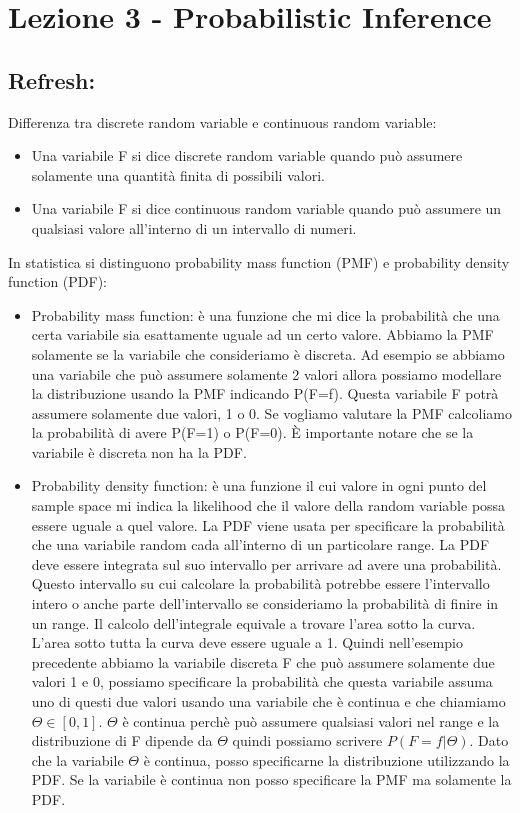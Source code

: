 \documentclass[14pt]{extreport}
\begin{document}
\chapter{Lezione 3 - Probabilistic Inference}

\section{Refresh: } Differenza tra discrete random variable e continuous random variable:
\begin{itemize}
\item Una variabile F si dice discrete random variable quando può assumere solamente una quantità finita di possibili valori.
\item Una variabile F si dice continuous random variable quando può assumere un qualsiasi valore all'interno di un intervallo di numeri.
\end{itemize}

In statistica si distinguono probability mass function (PMF) e probability density function (PDF):
\begin{itemize}
\item Probability mass function: è una funzione che mi dice la probabilità che una certa variabile sia esattamente uguale ad un certo valore. Abbiamo
la PMF solamente se la variabile che consideriamo è discreta. Ad esempio se abbiamo una variabile che può assumere solamente 2 valori allora possiamo
modellare la distribuzione usando la PMF indicando P(F=f). Questa variabile F potrà assumere solamente due valori, 1 o 0. Se vogliamo valutare la PMF
calcoliamo la probabilità di avere P(F=1) o P(F=0). È importante notare che se la variabile è discreta non ha la PDF.
\item Probability density function: è una funzione il cui valore in ogni punto del sample space mi indica la likelihood che il valore della random
variable possa essere uguale a quel valore. La PDF viene usata per specificare la probabilità che una variabile random cada all'interno di un
particolare range. La PDF deve essere integrata sul suo intervallo per arrivare ad avere una probabilità. Questo intervallo su cui calcolare la
probabilità potrebbe essere l'intervallo intero o anche parte dell'intervallo se consideriamo la probabilità di finire in un range. Il calcolo
dell'integrale equivale a trovare l'area sotto la curva. L'area sotto tutta la curva deve essere uguale a 1. Quindi nell'esempio precedente abbiamo la
variabile discreta F che può assumere solamente due valori 1 e 0, possiamo specificare la probabilità che questa variabile assuma uno di questi due
valori usando una variabile che è continua e che chiamiamo $\Theta \in [0,1]$. $\Theta$ è continua perchè può assumere qualsiasi valori nel range e la
distribuzione di F dipende da $\Theta$ quindi possiamo scrivere $P(F=f | \Theta)$. Dato che la variabile $\Theta$ è continua, posso specificarne la
distribuzione utilizzando la PDF. Se la variabile è continua non posso specificare la PMF ma solamente la PDF.
\end{itemize} 
\end{document}
